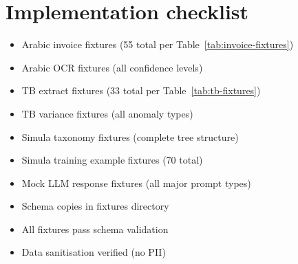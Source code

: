 \section{Implementation checklist}

\begin{itemize}
  \item[\texttt{[ ]}] Arabic invoice fixtures (55 total per Table~\ref{tab:invoice-fixtures})
  \item[\texttt{[ ]}] Arabic OCR fixtures (all confidence levels)
  \item[\texttt{[ ]}] TB extract fixtures (33 total per Table~\ref{tab:tb-fixtures})
  \item[\texttt{[ ]}] TB variance fixtures (all anomaly types)
  \item[\texttt{[ ]}] Simula taxonomy fixtures (complete tree structure)
  \item[\texttt{[ ]}] Simula training example fixtures (70 total)
  \item[\texttt{[ ]}] Mock LLM response fixtures (all major prompt types)
  \item[\texttt{[ ]}] Schema copies in fixtures directory
  \item[\texttt{[ ]}] All fixtures pass schema validation
  \item[\texttt{[ ]}] Data sanitisation verified (no PII)
\end{itemize}
